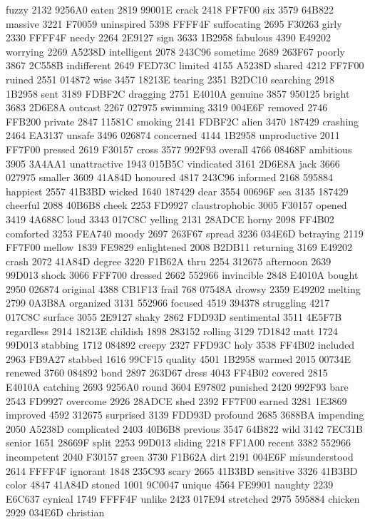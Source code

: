 fuzzy 2132 9256A0 eaten 2819 99001E crack 2418 FF7F00 six 3579 64B822
massive 3221 F70059 uninspired 5398 FFFF4F suffocating 2695 F30263
girly 2330 FFFF4F needy 2264 2E9127 sign 3633 1B2958 fabulous 4390
E49202 worrying 2269 A5238D intelligent 2078 243C96 sometime 2689
263F67 poorly 3867 2C558B indifferent 2649 FED73C limited 4155 A5238D
shared 4212 FF7F00 ruined 2551 014872 wise 3457 18213E tearing 2351
B2DC10 searching 2918 1B2958 sent 3189 FDBF2C dragging 2751 E4010A
genuine 3857 950125 bright 3683 2D6E8A outcast 2267 027975 swimming
3319 004E6F removed 2746 FFB200 private 2847 11581C smoking 2141 FDBF2C
alien 3470 187429 crashing 2464 EA3137 unsafe 3496 026874 concerned
4144 1B2958 unproductive 2011 FF7F00 pressed 2619 F30157 cross 3577
992F93 overall 4766 08468F ambitious 3905 3A4AA1 unattractive 1943
015B5C vindicated 3161 2D6E8A jack 3666 027975 smaller 3609 41A84D
honoured 4817 243C96 informed 2168 595884 happiest 2557 41B3BD wicked
1640 187429 dear 3554 00696F sea 3135 187429 cheerful 2088 40B6B8 cheek
2253 FD9927 claustrophobic 3005 F30157 opened 3419 4A688C loud 3343
017C8C yelling 2131 28ADCE horny 2098 FF4B02 comforted 3253 FEA740
moody 2697 263F67 spread 3236 034E6D betraying 2119 FF7F00 mellow 1839
FE9829 enlightened 2008 B2DB11 returning 3169 E49202 crash 2072 41A84D
degree 3220 F1B62A thru 2254 312675 afternoon 2639 99D013 shock 3066
FFF700 dressed 2662 552966 invincible 2848 E4010A bought 2950 026874
original 4388 CB1F13 frail 768 07548A drowsy 2359 E49202 melting 2799
0A3B8A organized 3131 552966 focused 4519 394378 struggling 4217 017C8C
surface 3055 2E9127 shaky 2862 FDD93D sentimental 3511 4E5F7B
regardless 2914 18213E childish 1898 283152 rolling 3129 7D1842 matt
1724 99D013 stabbing 1712 084892 creepy 2327 FFD93C holy 3538 FF4B02
included 2963 FB9A27 stabbed 1616 99CF15 quality 4501 1B2958 warmed
2015 00734E renewed 3760 084892 bond 2897 263D67 dress 4043 FF4B02
covered 2815 E4010A catching 2693 9256A0 round 3604 E97802 punished
2420 992F93 bare 2543 FD9927 overcome 2926 28ADCE shed 2392 FF7F00
earned 3281 1E3869 improved 4592 312675 surprised 3139 FDD93D profound
2685 3688BA impending 2050 A5238D complicated 2403 40B6B8 previous 3547
64B822 wild 3142 7EC31B senior 1651 28669F split 2253 99D013 sliding
2218 FF1A00 recent 3382 552966 incompetent 2040 F30157 green 3730
F1B62A dirt 2191 004E6F misunderstood 2614 FFFF4F ignorant 1848 235C93
scary 2665 41B3BD sensitive 3326 41B3BD color 4847 41A84D stoned 1001
9C0047 unique 4564 FE9901 naughty 2239 E6C637 cynical 1749 FFFF4F
unlike 2423 017E94 stretched 2975 595884 chicken 2929 034E6D christian
